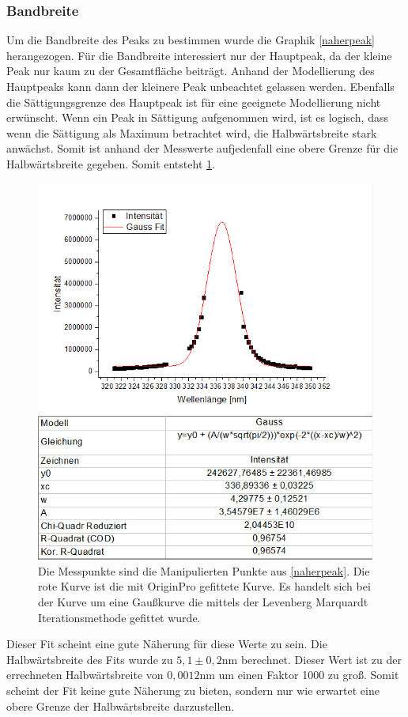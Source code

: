 \documentclass[
	a4paper,
	12pt,
	pagesize,
	ngerman
]{scrartcl}
\begin{document}
\subsubsection{Bandbreite}
Um die Bandbreite des Peaks zu bestimmen wurde die Graphik \cref{naherpeak} herangezogen. Für die Bandbreite interessiert nur der Hauptpeak, da der kleine Peak nur kaum zu der Gesamtfläche beiträgt. Anhand der Modellierung des Hauptpeaks kann dann der kleinere Peak unbeachtet gelassen werden. Ebenfalls die Sättigungsgrenze des Hauptpeak ist für eine geeignete Modellierung nicht erwünscht. Wenn ein Peak in Sättigung aufgenommen wird, ist es logisch, dass wenn die Sättigung als Maximum betrachtet wird, die Halbwärtsbreite stark anwächst. Somit ist anhand der Messwerte aufjedenfall eine obere Grenze für die Halbwärtsbreite gegeben.
Somit entsteht \cref{bilfun}. 
\begin{figure}[h!]
	\centering
	\includegraphics[scale = 1]{fitsnip.png}
	\caption{Die Messpunkte sind die Manipulierten Punkte aus \cref{naherpeak}. Die rote Kurve ist die mit OriginPro gefittete Kurve. Es handelt sich bei der Kurve um eine Gaußkurve die mittels der Levenberg Marquardt Iterationsmethode gefittet wurde.}
	\label{bilfun}
\end{figure}
Dieser Fit scheint eine gute Näherung für diese Werte zu sein. Die Halbwärtsbreite des Fits wurde zu $5,1 \pm 0,2$nm berechnet. Dieser Wert ist zu der errechneten Halbwärtsbreite von $0,0012$nm um einen Faktor 1000 zu groß. Somit scheint der Fit keine gute Näherung zu bieten, sondern nur wie erwartet eine obere Grenze der Halbwärtsbreite darzustellen.
\end{document}
